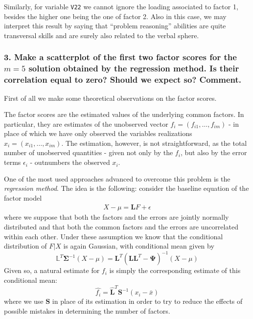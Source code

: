 \documentclass[
  letterpaper,
  DIV=11,
  numbers=noendperiod]{scrartcl}
\begin{document}
Similarly, for variable \texttt{V22} we cannot ignore the loading
associated to factor 1, besides the higher one being the one of factor
2. Also in this case, we may interpret this result by saying that
``problem reasoning'' abilities are quite transversal skills and are
surely also related to the verbal sphere.

\hypertarget{make-a-scatterplot-of-the-first-two-factor-scores-for-the-m-5-solution-obtained-by-the-regression-method.-is-their-correlation-equal-to-zero-should-we-expect-so-comment.}{%
\subsubsection{\texorpdfstring{3. Make a scatterplot of the first two
factor scores for the \(m = 5\) solution obtained by the regression
method. Is their correlation equal to zero? Should we expect so?
Comment.}{3. Make a scatterplot of the first two factor scores for the m = 5 solution obtained by the regression method. Is their correlation equal to zero? Should we expect so? Comment.}}\label{make-a-scatterplot-of-the-first-two-factor-scores-for-the-m-5-solution-obtained-by-the-regression-method.-is-their-correlation-equal-to-zero-should-we-expect-so-comment.}}

First of all we make some theoretical observations on the factor scores.

The factor scores are the estimated values of the underlying common
factors. In particular, they are estimates of the unobserved vector
\(f_i = (f_{i1}, \dots, f_{im})\) - in place of which we have only
observed the variables realizations \(x_i = (x_{i1}, \dots, x_{im})\).
The estimation, however, is not straightforward, as the total number of
unobserved quantities - given not only by the \(f_i\), but also by the
error terms \(\epsilon_i\) - outnumbers the observed \(x_i\).

One of the most used approaches advanced to overcome this problem is the
\emph{regression method}. The idea is the following: consider the
baseline equation of the factor model 
\begin{align}
  X - \mu = \mathbf{L}F + \epsilon
\end{align}
 where we suppose that both the factors and the errors are jointly
normally distributed and that both the common factors and the errors are
uncorrelated within each other. Under these assumption we know that the
conditional distribution of \(F|X\) is again Gaussian, with conditional
mean given by \[
 \mathbb{L}^T\mathbf{\Sigma}^{-1}(X-\mu) = \mathbf{L}^T(\mathbf{LL}^T -\mathbf{\Psi})^{-1}(X-\mu)
\] Given so, a natural estimate for \(f_i\) is simply the corresponding
estimate of this conditional mean: \[
\hat{f_i} = \hat{\mathbf{L}}^T\mathbf{S}^{-1}(x_i-\bar{x})
\] where we use \(\mathbf{S}\) in place of its estimation in order to
try to reduce the effects of possible mistakes in determining the number
of factors.
\end{document}
